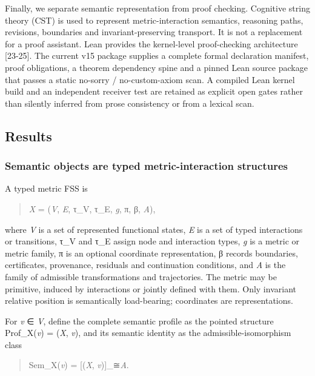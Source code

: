 Finally, we separate semantic representation from proof checking.
Cognitive string theory (CST) is used to represent metric-interaction
semantics, reasoning paths, revisions, boundaries and
invariant-preserving transport. It is not a replacement for a proof
assistant. Lean provides the kernel-level proof-checking architecture
{[}23-25{]}. The current v15 package supplies a complete formal
declaration manifest, proof obligations, a theorem dependency spine and
a pinned Lean source package that passes a static no-sorry /
no-custom-axiom scan. A compiled Lean kernel build and an independent
receiver test are retained as explicit open gates rather than silently
inferred from prose consistency or from a lexical scan.

\hypertarget{results}{%
\subsection{Results}\label{results}}

\hypertarget{semantic-objects-are-typed-metric-interaction-structures}{%
\subsubsection{Semantic objects are typed metric-interaction
structures}\label{semantic-objects-are-typed-metric-interaction-structures}}

A typed metric FSS is

\begin{quote}
\emph{X} = (\emph{V}, \emph{E}, τ\_V, τ\_E, \emph{g}, π, β, \emph{A}),
\end{quote}

where \emph{V} is a set of represented functional states, \emph{E} is a
set of typed interactions or transitions, τ\_V and τ\_E assign node and
interaction types, \emph{g} is a metric or metric family, π is an
optional coordinate representation, β records boundaries, certificates,
provenance, residuals and continuation conditions, and \emph{A} is the
family of admissible transformations and trajectories. The metric may be
primitive, induced by interactions or jointly defined with them. Only
invariant relative position is semantically load-bearing; coordinates
are representations.

For \emph{v} ∈ \emph{V}, define the complete semantic profile as the
pointed structure Prof\_X(\emph{v}) = (\emph{X}, \emph{v}), and its
semantic identity as the admissible-isomorphism class

\begin{quote}
Sem\_X(\emph{v}) = {[}(\emph{X}, \emph{v}){]}\_≅\emph{A}.
\end{quote}

